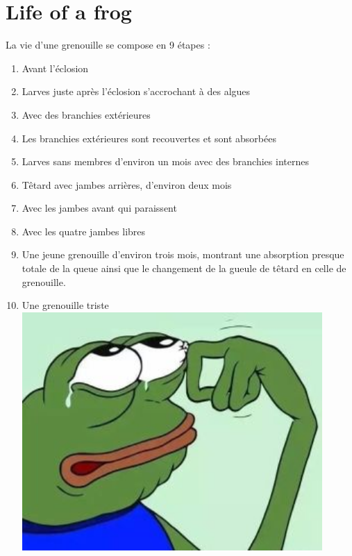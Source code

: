 \section{Life of a frog}
La vie d'une grenouille se compose en 9 étapes :
	\begin{enumerate}
	\item Avant l'éclosion
	\item Larves juste après l'éclosion s'accrochant à des algues
	\item Avec des branchies extérieures
	\item Les branchies extérieures sont recouvertes et sont absorbées
	\item Larves sans membres d'environ un mois avec des branchies internes
	\item Têtard avec jambes arrières, d'environ deux mois
	\item Avec les jambes avant qui paraissent
	\item Avec les quatre jambes libres
	\item Une jeune grenouille d'environ trois mois, montrant une absorption presque totale de la queue ainsi que le changement de la gueule de têtard en celle de grenouille.
	\item Une grenouille triste
	\includegraphics[width=0.9\textwidth]{photos/frog.jpg}
	\end{enumerate}
	